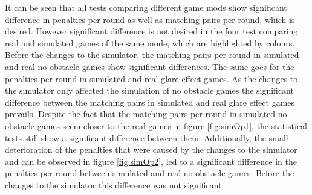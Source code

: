 It can be seen that all tests comparing different game mods show significant difference in penalties per round as well as matching pairs per round, which is desired. However significant difference is not desired in the four test comparing real and simulated games of the same mode, which are highlighted by colours. Before the changes to the simulator, the matching pairs per round in simulated and real no obstacle games show significant differences. The same goes for the penalties per round in simulated and real glare effect games. As the changes to the simulator only affected the simulation of no obstacle games the significant difference between the matching pairs in simulated and real glare effect games prevails. Despite the fact that the matching pairs per round in simulated no obstacle games seem closer to the real games in figure \ref{fig:simOp1}, the statistical tests still show a significant difference between them. Additionally, the small deterioration of the penalties that were caused by the changes to the simulator and can be observed in figure \ref{fig:simOp2}, led to a significant difference in the penalties per round between simulated and real no obstacle games. Before the changes to the simulator this difference was not significant.  

